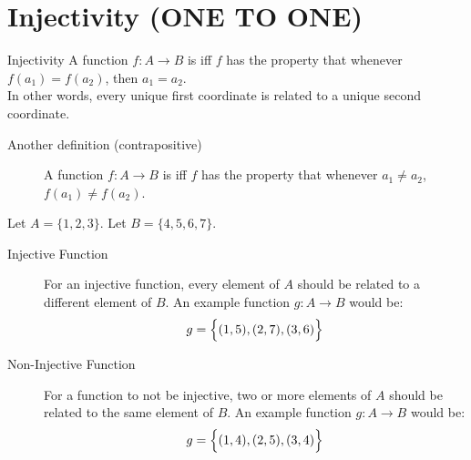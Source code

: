 \documentclass[../notes.tex]{subfiles}
\begin{document}
		\section[Injectivity]{Injectivity (ONE TO ONE)}
			\begin{definition}{Injectivity}
				A function $f: A \rightarrow B$ is  iff $f$ has the property that whenever $f(a_{1}) = f(a_{2})$, then $a_{1} = a_{2}$.\\
				In other words, every unique first coordinate is related to a unique second coordinate.
				\begin{description}
					\item[Another definition (contrapositive)] A function $f: A \rightarrow B$ is  iff $f$ has the property that whenever $a_{1} \neq a_{2}$, $f(a_{1}) \neq f(a_{2})$.
				\end{description}
			\end{definition}
			\begin{example}
				Let $A = \{1, 2, 3\}$. Let $B = \{4, 5, 6, 7\}$.
				\begin{description}
					\item[Injective Function] For an injective function, every element of $A$ should be related to a different element of $B$. An example function $g: A \rightarrow B$ would be:
						\begin{align*}
							g = \Bigl\{(1, 5), (2, 7), (3, 6)\Bigr\}
						\end{align*}
					\item[Non-Injective Function] For a function to not be injective, two or more elements of $A$ should be related to the same element of $B$. An example function $g: A \rightarrow B$ would be:
						\begin{align*}
							g = \Bigl\{(1, 4), (2, 5), (3, 4)\Bigr\}
						\end{align*}
				\end{description}
			\end{example}
\end{document}
